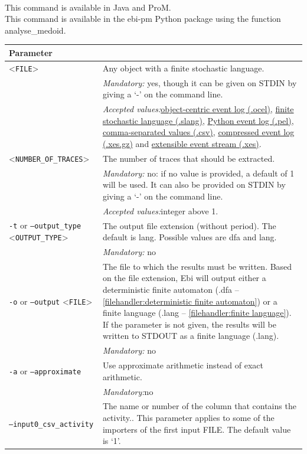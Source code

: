 {\\This command is available in Java and ProM.
\\This command is available in the ebi-pm Python package using the function analyse\_medoid.
\begin{tabularx}{\linewidth}{lX}
\toprule
Parameter \\\midrule
<\texttt{FILE}>&Any object with a finite stochastic language.\\
&\textit{Mandatory:} \quad yes, though it can be given on STDIN by giving a `-' on the command line.\\
&\textit{Accepted values:}\quad \hyperref[filehandler:object-centric event log]{object-centric event log (.ocel)}, \hyperref[filehandler:finite stochastic language]{finite stochastic language (.slang)}, \hyperref[filehandler:Python event log]{Python event log (.pel)}, \hyperref[filehandler:comma-separated values]{comma-separated values (.csv)}, \hyperref[filehandler:compressed event log]{compressed event log (.xes.gz)} and \hyperref[filehandler:extensible event stream]{extensible event stream (.xes)}.\\
<\texttt{NUMBER\_OF\_TRACES}>&The number of traces that should be extracted.\\
&\textit{Mandatory:} \quad no: if no value is provided, a default of 1 will be used. It can also be provided on STDIN by giving a `-' on the command line.\\
&\textit{Accepted values:}\quad integer above 1.\\
\texttt{-t} or \texttt{--output\_type} <\texttt{OUTPUT\_TYPE}> &
The output file extension (without period). The default is lang. Possible values are dfa and lang.\\
&\textit{Mandatory:} \quad no\\
\texttt{-o} or \texttt{--output} <\texttt{FILE}> &
The file to which the results must be written. Based on the file extension, Ebi will output either a deterministic finite automaton (.dfa -- \cref{filehandler:deterministic finite automaton}) or a finite language (.lang -- \cref{filehandler:finite language}).
If the parameter is not given, the results will be written to STDOUT as a finite language (.lang).\\
&\textit{Mandatory:} \quad no\\
\texttt{-a} or \texttt{--approximate} & Use approximate arithmetic instead of exact arithmetic.\\
&\textit{Mandatory:}\quad no\\
\texttt{--input0\_csv\_activity} & The name or number of the column that contains the activity.. This parameter applies to some of the importers of the first input FILE. The default value is `1'.\\

\end{tabularx}}
